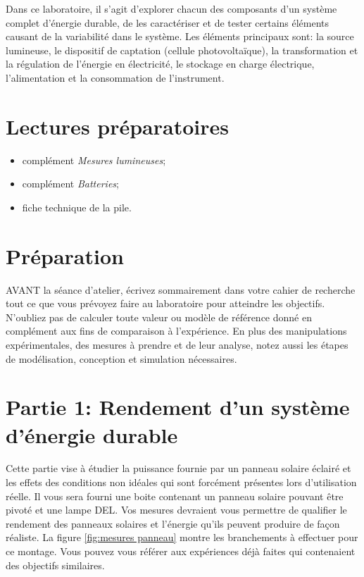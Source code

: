 \documentclass[canadien,12pt,oneside,letterpaper]{article}
\begin{document}
Dans ce laboratoire, il s'agit d'explorer chacun des composants d'un système complet d'énergie durable, de les caractériser et de tester certains éléments causant de la variabilité dans le système. Les éléments principaux sont: la source lumineuse, le dispositif de captation (cellule photovoltaïque), la transformation et la régulation de l'énergie en électricité, le stockage en charge électrique, l'alimentation et la consommation de l'instrument.

\section{Lectures préparatoires}\label{sec:lectures preparatoires}
\vspace{-2ex}
\begin{itemize}
\item complément \textit{Mesures lumineuses};
\item complément \textit{Batteries};
\item fiche technique de la pile.
\end{itemize}

\section{Préparation}\label{sec:preparation}
\vspace{-2ex}
AVANT la séance d’atelier, écrivez sommairement dans votre cahier de recherche
tout ce que vous prévoyez faire au laboratoire pour atteindre les objectifs. N’oubliez
pas de calculer toute valeur ou modèle de référence donné en complément aux fins de
comparaison à l’expérience. En plus des manipulations expérimentales, des mesures
à prendre et de leur analyse, notez aussi les étapes de modélisation, conception et
simulation nécessaires. 


\section{Partie 1: Rendement d'un système d'énergie durable}\label{sec:partie1}
\vspace{-2ex}

Cette partie vise à étudier la puissance fournie par un panneau solaire éclairé et les effets des conditions non idéales qui sont forcément présentes lors d'utilisation réelle. Il vous sera fourni une boite contenant un panneau solaire pouvant être pivoté et une lampe DEL. Vos mesures devraient vous permettre de qualifier le rendement des panneaux solaires et l'énergie qu'ils peuvent produire de façon réaliste. La figure \ref{fig:mesures panneau} montre les branchements à effectuer pour ce montage. Vous pouvez vous référer aux expériences déjà faites qui contenaient des objectifs similaires.
\end{document}
